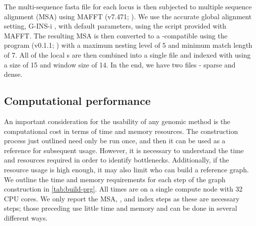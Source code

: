 The multi-sequence fasta file for each locus is then subjected to multiple sequence alignment (MSA) using MAFFT (v7.471; \cite{nakamura2018}). We use the accurate global alignment setting, G-INS-i \cite{katoh2016}, with default parameters, using the  script provided with MAFFT. The resulting MSA is then converted to a \pandora{}-compatible \prg{} using the \makeprg{} program (v0.1.1; ) with a maximum nesting level of 5 and minimum match length of 7. All of the local \prg{}s are then combined into a single \prg{} file and indexed with \pandora{} using a \kmer{} size of 15 and window size of 14. In the end, we have two \prg{} files - sparse and dense.

\subsection{Computational performance}
\label{sec:tbprg-comp-perf}

An important consideration for the usability of any genomic method is the computational cost in terms of time and memory resources. The construction process just outlined need only be run once, and then it can be used as a reference for subsequent \pandora{} usage. However, it is necessary to understand the time and resources required in order to identify bottlenecks. Additionally, if the resource usage is high enough, it may also limit who can build a reference graph. We outline the time and memory requirements for each step of the graph construction in \autoref{tab:build-prg}. All times are on a single compute node with 32 CPU cores. We only report the MSA, \makeprg{}, and \pandora{} index steps as these are necessary steps; those preceding use little time and memory and can be done in several different ways.

